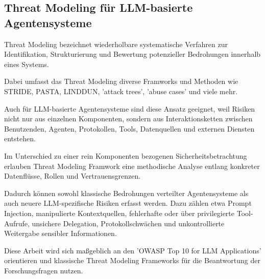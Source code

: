 \subsection{Threat Modeling für LLM-basierte Agentensysteme}

Threat Modeling bezeichnet wiederholbare systematische Verfahren zur Identifikation, Strukturierung und Bewertung potenzieller Bedrohungen innerhalb eines Systems. \cite{owasp_owasp_nodate, shostack2014threat}

Dabei umfasst das Threat Modeling diverse Framworks und Methoden wie STRIDE, PASTA, LINDDUN, 'attack trees', 'abuse cases' und viele mehr. \cite{owasp_owasp_nodate}

Auch für LLM-basierte Agentensysteme sind diese Ansatz geeignet, weil Risiken nicht nur aus einzelnen Komponenten, sondern aus Interaktionsketten zwischen Benutzenden, Agenten, Protokollen, Tools, Datenquellen und externen Diensten entstehen. \cite{krawiecka_extending_2025}

Im Unterschied zu einer rein Komponenten bezogenen Sicherheitsbetrachtung erlauben Threat Modeling Framwork eine methodische Analyse entlang konkreter Datenflüsse, Rollen und Vertrauensgrenzen. \cite{shostack2014threat, owasp_owasp_nodate, wong_adding_2000}

Dadurch können sowohl klassische Bedrohungen verteilter Agentensysteme als auch neuere LLM-spezifische Risiken erfasst werden. \cite{krawiecka_extending_2025, noauthor_threat_2026}
Dazu zählen etwa Prompt Injection, manipulierte Kontextquellen, fehlerhafte oder über privilegierte Tool-Aufrufe, unsichere Delegation, Protokollschwächen und unkontrollierte Weitergabe sensibler Informationen. \cite{ferrag_prompt_2026, anbiaee_security_2026m, zhang_agent_2026, krawiecka_extending_2025}

Diese Arbeit wird sich maßgeblich an den 'OWASP Top 10 for LLM Applications' \cite{editor_owasp_nodate} orientieren und klassische Threat Modeling Frameworks für die Beantwortung der Forschungsfragen nutzen.



